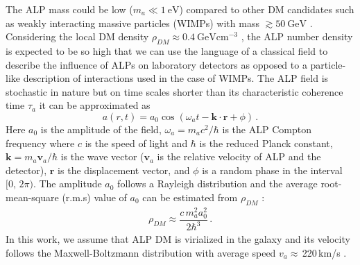 \documentclass{WileyMSP-template}
\newcommand{\DK}[1]{\textcolor{brown}{Derek: #1}}
\newcommand{\AW}[1]{\textcolor{cyan}{Arne: #1}}
\begin{document}
	The ALP mass
	could be low ($m_a \ll \SI{1}{\eV}$) compared to other DM candidates such as weakly interacting massive particles (WIMPs) with mass
	$\gtrsim\SI{50}{\GeV}$ \cite{Bertone2010_momentWIMP}. 
	Considering the local DM density $\rho_{DM}\approx\SI{0.4}{\GeV\cm^{-3}}$ \cite{BERGSTROM1998137, Jungman1992SupersymmetricDM, Sofue_RotationCurves}, the ALP number density is expected to be so high that we can use the language of a classical field to describe the influence of ALPs on laboratory detectors as opposed to a particle-like description of interactions used in the case of WIMPs. The ALP field is stochastic in nature \cite{Centers2021Stochastic} but on time scales shorter than its characteristic coherence time $\tau_a$ it can be approximated as  
	\begin{equation}
		a(r,t) = a_0 \cos(\omega_a t - \mathbf{k}\cdot \mathbf{r} + \phi)
		\,.\label{eq:ALP_field}
	\end{equation}
	Here $a_0$ is the amplitude of the field, $\omega_a = m_a c^2/\hbar$ is the ALP Compton frequency where $c$ is the speed of light and $\hbar$ is the reduced Planck constant, $\mathbf{k} = m_a \mathbf{v}_a/\hbar$ is the wave vector ($\mathbf{v}_a$ is the relative velocity of ALP and the detector), $\mathbf{r}$ is the displacement vector, and $\phi$ is a random phase in the interval $[0,\, 2\pi)$. The amplitude $a_0$ follows a Rayleigh distribution and the average root-mean-square (r.m.s) value of $a_0$ can be estimated from $\rho_{DM}$ \cite{KimballOverview, Centers2021Stochastic, Gramolin2021NaturePhysics}:
	\begin{align}
		\rho_{DM} \approx \dfrac{c\, m_a^2 a_0^2}{2\hbar^3}
		\,.\label{eq:rhoDM} 
	\end{align}
	In this work, we assume that ALP DM is virialized in the galaxy and its velocity follows the Maxwell-Boltzmann distribution with average speed $v_a\approx$\,220\,km/s \cite{Evans2019SHM++_PhysRevD}.
\end{document}

